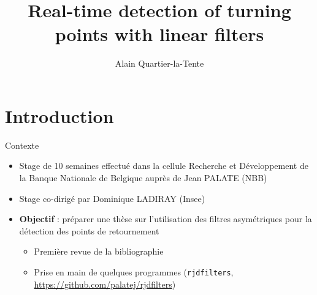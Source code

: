 \documentclass[10pt,xcolor=table,color={dvipsnames,usenames},ignorenonframetext,usepdftitle=false,french]{beamer}
\title{Real-time detection of turning points with linear filters}
\author{Alain Quartier-la-Tente}
\date{}
\providecommand{\tightlist}{%
  \setlength{\parskip}{0pt}
  }
\newcommand\1{\mathds{1}}
\begin{document}
\begin{frame}
\titlepage
\end{frame}

\hypertarget{introduction}{%
\section{Introduction}\label{introduction}}

\begin{frame}[fragile]{Contexte}
\protect\hypertarget{contexte}{}
\begin{itemize}
\tightlist
\item
  Stage de 10 semaines effectué dans la cellule Recherche et
  Développement de la Banque Nationale de Belgique auprès de Jean PALATE
  (NBB)
\end{itemize}

\bigskip

\begin{itemize}
\tightlist
\item
  Stage co-dirigé par Dominique LADIRAY (Insee)
\end{itemize}

\bigskip

\begin{itemize}
\item
  \textbf{Objectif} : préparer une thèse sur l'utilisation des filtres
  asymétriques pour la détection des points de retournement

  \begin{itemize}
  \item
    Première revue de la bibliographie
  \item
    Prise en main de quelques programmes 
    (\texttt{rjdfilters}, \url{https://github.com/palatej/rjdfilters})
  \end{itemize}
\end{itemize}
\end{frame}
\end{document}
